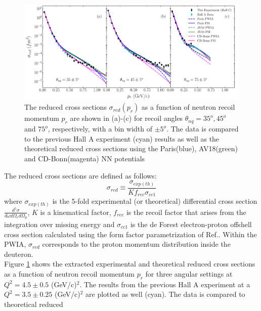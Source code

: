 \begin{center}
\begin{figure}[hb!]
\includegraphics[scale=0.46]{../prl_plots/PRL_plot1.pdf}
\caption{The reduced cross sections $\sigma_{red}(p_{r})$ as a function of neutron recoil momentum $p_{r}$ are shown in (a)-(c) for recoil angles $\theta_{nq}=35^{o}, 45^{o}$ and $75^{o}$, respectively,
with a bin width of $\pm 5^{o}$. The data is compared to the previous Hall A experiment (cyan) results\cite{PhysRevLett.107.262501} as well as the theoretical reduced cross sections using the Paris(blue),
AV18(green) and CD-Bonn(magenta) NN potentials}
\label{fig:fig1}
\end{figure}
\end{center}
\twocolumngrid
\noindent The reduced cross sections are defined as follows:
\begin{equation}
\sigma_{red} \equiv \frac{\sigma_{exp(th)}}{Kf_{rec}\sigma_{cc1}}
\label{eq:1}
\end{equation}
where $\sigma_{exp(th)}$ is the 5-fold experimental (or theoretical) differential cross section $\frac{d^{5}\sigma}{d\omega d\Omega_{e} d\Omega_{p}}$, $K$ is a kinematical factor, $f_{rec}$ is the recoil factor that arises from the
integration over missing energy and $\sigma_{cc1}$ is the de Forest\cite{DEFOREST1983} electron-proton offshell cross section calculated using the form factor parametrization of Ref.\cite{PhysRevC.69.022201}.
Within the PWIA, $\sigma_{red}$ corresponds to the proton momentum distribution inside the deuteron. \\
\indent Figure \ref{fig:fig1} shows the extracted experimental and theoretical reduced cross sections as a function of neutron recoil momentum $p_{r}$ for three angular settings at $Q^{2}=4.5\pm0.5$
(GeV/c)$^{2}$. The results from the previous Hall A experiment\cite{PhysRevLett.107.262501} at a $Q^{2}=3.5\pm0.25$ (GeV/c)$^{2}$ are plotted as well (cyan). The data is compared to theoretical reduced
